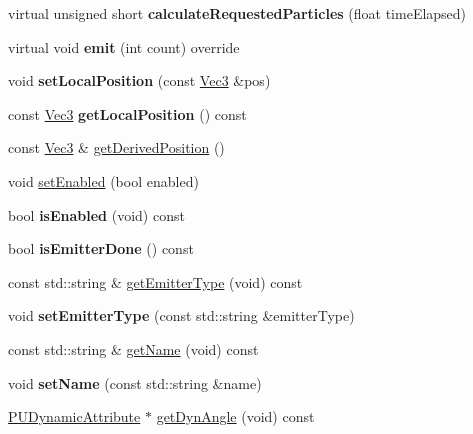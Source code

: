 \begin{DoxyCompactItemize}
\mbox{\label{classPUEmitter_a04018dd961dd70c6a56e1d1aea209440}} 
virtual unsigned short {\bfseries calculate\+Requested\+Particles} (float time\+Elapsed)
\item 
\mbox{\label{classPUEmitter_a5a7c26acb6e60ea409438326dd5ed6d2}} 
virtual void {\bfseries emit} (int count) override
\item 
\mbox{\label{classPUEmitter_a3ce54a9192dca2a7ede165150eeddbb0}} 
void {\bfseries set\+Local\+Position} (const \hyperlink{classVec3}{Vec3} \&pos)
\item 
\mbox{\label{classPUEmitter_a115ef783e84aee1626dc20ddb4b43765}} 
const \hyperlink{classVec3}{Vec3} {\bfseries get\+Local\+Position} () const
\item 
const \hyperlink{classVec3}{Vec3} \& \hyperlink{classPUEmitter_a157e8c65ae506cd3b94303fa5a2d8fea}{get\+Derived\+Position} ()
\item 
void \hyperlink{classPUEmitter_a4f257171b370033d2ca3544867912645}{set\+Enabled} (bool enabled)
\item 
\mbox{\label{classPUEmitter_a3fba3a4ea416f98e87092c56ae7d2a66}} 
bool {\bfseries is\+Enabled} (void) const
\item 
\mbox{\label{classPUEmitter_ab123febe49418c9c012315c87410b6b8}} 
bool {\bfseries is\+Emitter\+Done} () const
\item 
const std\+::string \& \hyperlink{classPUEmitter_a1feb299bc5e8c15a218f5122edb167ed}{get\+Emitter\+Type} (void) const
\item 
\mbox{\label{classPUEmitter_af96e8544236036fb6e7a9f7bb5597913}} 
void {\bfseries set\+Emitter\+Type} (const std\+::string \&emitter\+Type)
\item 
const std\+::string \& \hyperlink{classPUEmitter_a8b2f555b76240316aa37a5fb4e34e27b}{get\+Name} (void) const
\item 
\mbox{\label{classPUEmitter_a9cd134f4869abfb180ad56b30db42d48}} 
void {\bfseries set\+Name} (const std\+::string \&name)
\item 
\hyperlink{classPUDynamicAttribute}{P\+U\+Dynamic\+Attribute} $\ast$ \hyperlink{classPUEmitter_a375b1d6bd2dc610808eac3acffa1e136}{get\+Dyn\+Angle} (void) const

\end{DoxyCompactItemize}
